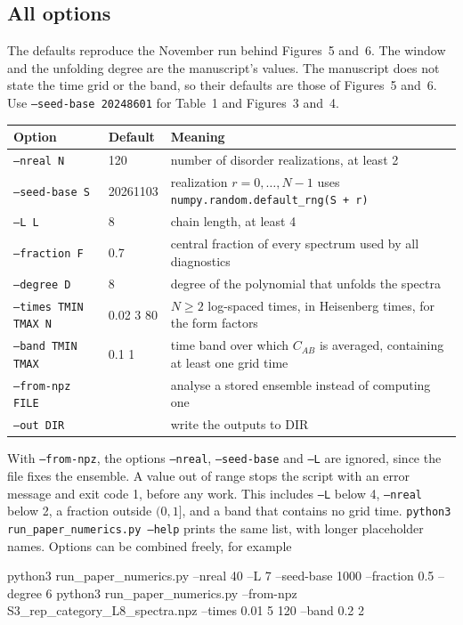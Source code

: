 \documentclass[11pt,a4paper]{article}
\newcommand{\code}[1]{\texttt{\textcolor{codeink}{#1}}}
\begin{document}
\subsection{All options}\label{sec:options}

The defaults reproduce the November run behind Figures~5 and~6. The window and the unfolding degree are the
manuscript's values. The manuscript does not state the time grid or the band, so their defaults are those of
Figures~5 and~6. Use \code{--seed-base 20248601} for Table~1 and Figures~3 and~4.

\begingroup\small
\begin{tabularx}{\linewidth}{L{4.0cm}L{2.0cm}Y}
\toprule{}\textbf{Option} & \textbf{Default} & \textbf{Meaning}\\\midrule
\code{--nreal N} & 120 & number of disorder realizations, at least 2\\
\code{--seed-base S} & 20261103 & realization $r = 0, \ldots, N-1$ uses \code{numpy.random.default\_rng(S + r)}\\
\code{--L L} & 8 & chain length, at least 4\\
\code{--fraction F} & 0.7 & central fraction of every spectrum used by all diagnostics\\
\code{--degree D} & 8 & degree of the polynomial that unfolds the spectra\\
\code{--times TMIN TMAX N} & 0.02 3 80 & $N\geq 2$ log-spaced times, in Heisenberg times, for the form factors\\
\code{--band TMIN TMAX} & 0.1 1 & time band over which $C_{AB}$ is averaged, containing at least one grid time\\
\code{--from-npz FILE} & & analyse a stored ensemble instead of computing one\\
\code{--out DIR} & & write the outputs to DIR\\
\bottomrule
\end{tabularx}\par
\endgroup

With \code{--from-npz}, the options \code{--nreal}, \code{--seed-base} and \code{--L} are ignored, since the file
fixes the ensemble. A value out of range stops the script with an error message and exit code 1, before any work.
This includes \code{--L} below 4, \code{--nreal} below 2, a fraction outside $(0,1]$, and a band that contains no
grid time. \code{python3 run\_paper\_numerics.py --help} prints the same list, with longer placeholder
names. Options can be combined freely, for example
\begin{shell}
python3 run_paper_numerics.py --nreal 40 --L 7 --seed-base 1000 --fraction 0.5 --degree 6
python3 run_paper_numerics.py --from-npz S3_rep_category_L8_spectra.npz --times 0.01 5 120 --band 0.2 2
\end{shell}
\end{document}
